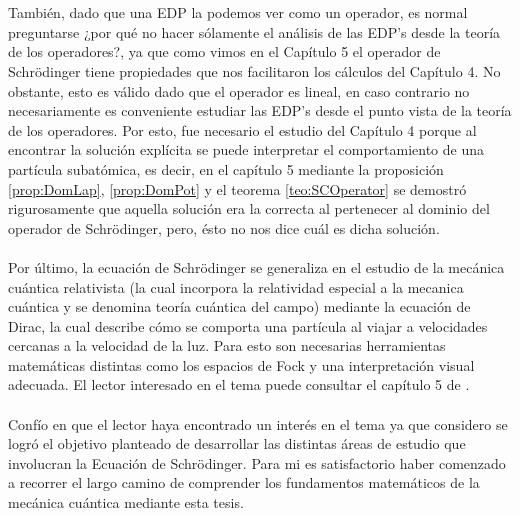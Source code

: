 \documentclass[12pt]{article}
\theoremstyle{definition}
\begin{document}
\\ \\ 
También, dado que una EDP la podemos ver como un operador, es normal preguntarse ¿por qué no hacer sólamente el análisis de las EDP's desde la teoría de los operadores?, ya que como vimos en el Capítulo 5 el operador de Schrödinger tiene propiedades que nos facilitaron los cálculos del Capítulo 4. No obstante, esto es válido dado que el operador es lineal, en caso contrario no necesariamente es conveniente estudiar las EDP's desde el punto vista de la teoría de los operadores. Por esto, fue necesario el estudio del Capítulo 4 porque al encontrar la solución explícita se puede interpretar el  comportamiento de una partícula subatómica, es decir, en el capítulo 5 mediante la proposición \ref{prop:DomLap}, \ref{prop:DomPot} y el teorema \ref{teo:SCOperator} se demostró rigurosamente que aquella solución era la correcta al pertenecer al dominio del operador de Schrödinger, pero, ésto no nos dice cuál es dicha solución. 
\\ \\
Por último, la ecuación de Schrödinger se generaliza en el estudio de la mecánica cuántica relativista (la cual incorpora la relatividad especial a la mecanica cuántica y se denomina teoría cuántica del campo) mediante la ecuación de Dirac, la cual describe cómo se comporta una partícula al viajar a velocidades cercanas a la velocidad de la luz. Para esto son necesarias herramientas matemáticas distintas como los espacios de Fock y una interpretación visual adecuada. El lector interesado en el tema puede consultar el capítulo 5 de \cite{Schwabl}.
\\ \\
Confío en que el lector haya encontrado un interés en el tema ya que considero se logró el objetivo planteado de desarrollar las distintas áreas de estudio que involucran la Ecuación de Schrödinger. Para mi es satisfactorio haber comenzado a recorrer el largo camino de comprender los fundamentos matemáticos de la mecánica cuántica mediante esta tesis. 
\end{document}
